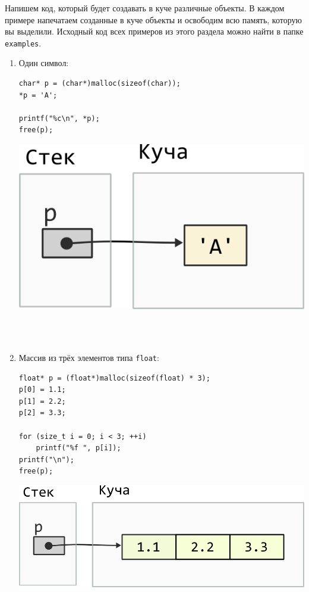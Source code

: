 \documentclass{article}
\begin{document}
Напишем код, который будет создавать в куче различные объекты. В каждом примере напечатаем созданные в куче объекты и освободим всю память, которую вы выделили. Исходный код всех примеров из этого раздела можно найти в папке \texttt{examples}.
\begin{enumerate}


\item Один символ:\\
\noindent\begin{minipage}{.50\textwidth}
\begin{lstlisting}[style=heapExamplesStyle]
char* p = (char*)malloc(sizeof(char));
*p = 'A';

printf("%c\n", *p);
free(p);
\end{lstlisting}
\end{minipage}\hfill
\begin{minipage}{.40\textwidth}
\includegraphics[scale=0.7]{../images/malloc_class_tasks/heap_char.png}
\end{minipage}
\quad\\
\quad\\


\item Массив из трёх элементов типа \texttt{float}:\\
\noindent\begin{minipage}{.50\textwidth}
\begin{lstlisting}[style=heapExamplesStyle]
float* p = (float*)malloc(sizeof(float) * 3);
p[0] = 1.1;
p[1] = 2.2;
p[2] = 3.3;

for (size_t i = 0; i < 3; ++i)
    printf("%f ", p[i]);
printf("\n");
free(p);
\end{lstlisting}
\end{minipage}\hfill
\begin{minipage}{.4\textwidth}
\includegraphics[scale=0.7]{../images/malloc_class_tasks/heap_double_array.png}
\end{minipage}
\quad\\
\quad\\



\end{enumerate}
\end{document}

